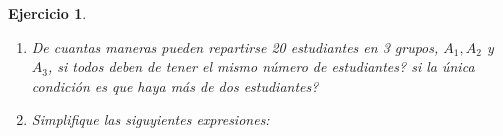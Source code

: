 \documentclass[12pt,twoside]{article}
\newtheorem{Ejer}{Ejercicio}
\begin{document}
\begin{Ejer}
\begin{enumerate}
\item De cuantas maneras pueden repartirse 20 estudiantes en 3 grupos, $A_{1},A_{2}$ y $A_{3}$,   si todos deben de tener el mismo n\'umero de estudiantes? si la \'unica condici\'on es que haya m\'as de dos estudiantes?

\item Simplifique las siguyientes expresiones:

\begin{itemize}
\end{itemize}

\end{enumerate}

\end{Ejer}
\end{document}
